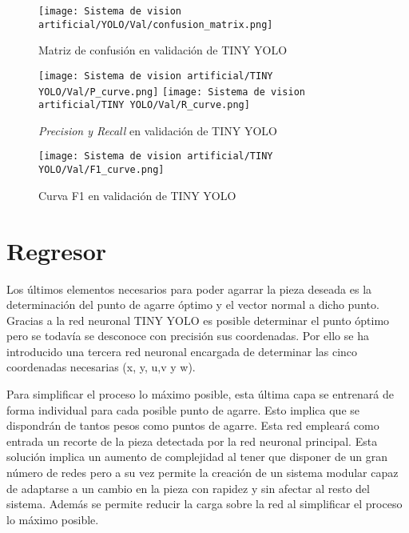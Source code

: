 \begin{figure}[H]
	\centering
	\texttt{[image: Sistema de vision artificial/YOLO/Val/confusion\_matrix.png]}
	\caption{Matriz de confusión en validación de TINY YOLO}
	\label{chap:Sistema de visión artificial fig:TINY YOLO Val Matrix}
\end{figure}

\begin{figure}[H]
	\centering
    \texttt{[image: Sistema de vision artificial/TINY YOLO/Val/P\_curve.png]} \hfill
    \texttt{[image: Sistema de vision artificial/TINY YOLO/Val/R\_curve.png]}
	\caption{\textit{Precision y Recall} en validación de TINY YOLO}
	\label{chap:Sistema de visión artificial fig:TINY YOLO Val PR}
\end{figure}

\begin{figure}[H]
	\centering
	\texttt{[image: Sistema de vision artificial/TINY YOLO/Val/F1\_curve.png]}
	\caption{Curva F1 en validación de TINY YOLO}
	\label{chap:Sistema de visión artificial fig:TINY YOLO Val F1}
\end{figure}


\newpage
\section{Regresor}
\label{chap:Sistema de visión artificial sec:Regresor}
Los últimos elementos necesarios para poder agarrar la pieza deseada es la determinación del punto de agarre óptimo y el vector normal a dicho punto. Gracias a la red neuronal TINY YOLO es posible determinar el punto óptimo pero se todavía se desconoce con precisión sus coordenadas. Por ello se ha introducido una tercera red neuronal encargada de determinar las cinco coordenadas necesarias (x, y, u,v y w).

Para simplificar el proceso lo máximo posible, esta última capa se entrenará de forma individual para cada posible punto de agarre. Esto implica que se dispondrán de tantos pesos como puntos de agarre. Esta red empleará como entrada un recorte de la pieza detectada por la red neuronal principal. Esta solución implica un aumento de complejidad al tener que disponer de un gran número de redes pero a su vez permite la creación de un sistema modular capaz de adaptarse a un cambio en la pieza con rapidez y sin afectar al resto del sistema. Además se permite reducir la carga sobre la red al simplificar el proceso lo máximo posible.

